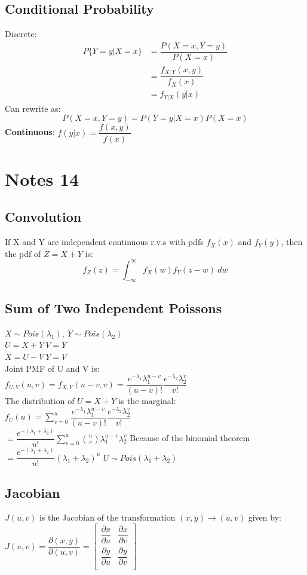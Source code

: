 \documentclass[openany]{book}
\begin{document}
\begin{flushleft}
\section{Conditional Probability}
Discrete:\\
\begin{align*}
P\{Y=y|X=x \}&=\dfrac{P(X=x,Y=y)}{P(X=x)}\\
&=\dfrac{f_{X,Y}(x,y)}{f_X(x)}\\
&=f_{Y|X}(y|x)
\end{align*}
Can rewrite as:\\
\[P(X=x,Y=y)=P(Y=y|X=x)P(X=x)
\]
\textbf{Continuous}: $f(y|x)=\dfrac{f(x,y)}{f(x)}$

\chapter{Notes 14}
\section{Convolution}
If X and Y are independent continuous r.v.s with pdfs $f_X(x)$ and $f_Y(y)$, then the pdf of $Z=X+Y$ is:
\[f_Z(z)=\int_{-\infty}^{\infty}f_X(w)f_Y(z-w)\ dw
\]
\section{Sum of Two Independent Poissons}
$X\sim Pois(\lambda_1), \ Y\sim Pois(\lambda_2)$\\
$U=X+Y \ V=Y$\\
$X=U-V \ Y=V$\\
Joint PMF of U and V is:\\
$f_{U,V}(u,v)=f_{X,Y}(u-v,v)=\dfrac{e^{-\lambda_1}\lambda_1^{u-v}}{(u-v)!}\dfrac{e^{-\lambda_2}\lambda_2^v}{v!}$\\
The distribution of $U=X+Y$ is the marginal:\\
$f_U(u)=\sum_{v=0}^{u}\dfrac{e^{-\lambda_1}\lambda_1^{u-v}}{(u-v)!}\dfrac{e^{-\lambda_2}\lambda_2^v}{v!}$\\
$=\dfrac{e^{-(\lambda_1+\lambda_2)}}{u!}\sum_{v=0}^{u} {u \choose v}\lambda_1^{u-v}\lambda_2^v$\medbreak
Because of the binomial theorem\medbreak
$=\dfrac{e^{-(\lambda_1+\lambda_2)}}{u!}(\lambda_1+\lambda_2)^u$\medbreak
$U\sim Pois(\lambda_1+\lambda_2)$
\section{Jacobian}
$J(u,v)$ is the Jacobian of the transformation $(x,y)\to (u,v)$ given by:\medbreak
$J(u,v)=\dfrac{\partial(x,y)}{\partial(u,v)}=
\begin{bmatrix}
\dfrac{\partial x}{\partial u}& \dfrac{\partial x}{\partial v}\\
\dfrac{\partial y}{\partial u}& \dfrac{\partial y}{\partial v}\\
\end{bmatrix}$

\end{flushleft}
\end{document}
